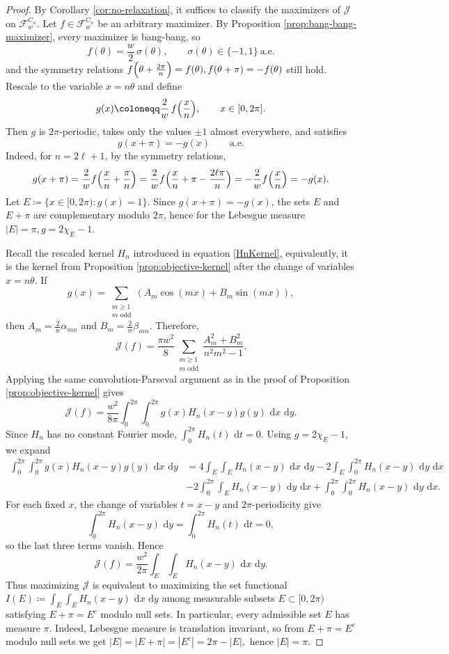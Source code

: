 \documentclass[11pt,letterpaper,reqno]{amsart}
\newcommand{\dd}{\,\mathrm{d}}
\begin{document}
\begin{proof}
By Corollary \ref{cor:no-relaxation}, it suffices to classify the maximizers of $\mathcal J$ on $\mathcal F_w^{C_n}$. Let $f\in\mathcal F_w^{C_n}$ be an arbitrary maximizer. By Proposition \ref{prop:bang-bang-maximizer}, every maximizer is bang-bang, so
\[
f(\theta)=\frac w2\,\sigma(\theta),\qquad \sigma(\theta)\in\{-1,1\}\ \text{a.e.}
\]
and the symmetry relations
\(
f\Bigl(\theta+\frac{2\pi}{n}\Bigr)=f(\theta),
f(\theta+\pi)=-f(\theta)
\)
still hold.
Rescale to the variable $x=n\theta$ and define
\[
g(x)\coloneqq \frac{2}{w}\,f\Bigl(\frac{x}{n}\Bigr),\qquad x\in[0,2\pi].
\]
Then $g$ is $2\pi$-periodic, takes only the values $\pm1$ almost everywhere, and satisfies
\[
g(x+\pi)=-g(x)\qquad\text{a.e.}
\]
Indeed, for $n=2\ell+1$, by the symmetry relations,
\[
g(x+\pi)=\frac{2}{w}f\Bigl(\frac{x}{n}+\frac{\pi}{n}\Bigr)=\frac{2}{w}f\Bigl(\frac{x}{n}+\pi-\frac{2\ell\pi}{n}\Bigr)=-\frac{2}{w}f\Bigl(\frac{x}{n}\Bigr)=-g(x).
\]
Let
\(
E\coloneqq\{x\in[0,2\pi):g(x)=1\}.
\)
Since $g(x+\pi)=-g(x)$, the sets $E$ and $E+\pi$ are complementary modulo $2\pi$, hence for the Lebesgue measure
\(
|E|=\pi,
g=2\chi_E-1.
\)

Recall the rescaled kernel $H_n$ introduced in equation \eqref{HnKernel}, equivalently, it is the kernel from Proposition \ref{prop:objective-kernel} after the change of variables $x=n\theta$.
If
\[
g(x)=\sum_{\substack{m\ge1\\m\text{ odd}}}(A_m\cos(mx)+B_m\sin(mx)),
\]
then $A_m=\frac{2}{w}\alpha_{mn}$ and $B_m=\frac{2}{w}\beta_{mn}$. Therefore,
\[
\mathcal J(f)=\frac{\pi w^2}{8}\sum_{\substack{m\ge1\\m\text{ odd}}}\frac{A_m^2+B_m^2}{n^2m^2-1}.
\]
Applying the same convolution-Parseval argument as in the proof of Proposition \ref{prop:objective-kernel} gives
\[
\mathcal J(f)=\frac{w^2}{8\pi}\int_0^{2\pi}\int_0^{2\pi} g(x)H_n(x-y)g(y)\,\dd x\,\dd y.
\]
Since $H_n$ has no constant Fourier mode,
\(
\int_0^{2\pi}H_n(t)\,\dd t=0.
\)
Using $g=2\chi_E-1$, we expand
\begin{align*}
\int_0^{2\pi}\!\int_0^{2\pi} g(x)H_n(x-y)g(y)\,\dd x\,\dd y&=
4\int_E\!\int_E H_n(x-y)\,\dd x\,\dd y -2\int_E\!\int_0^{2\pi} H_n(x-y)\,\dd y\,\dd x\\
&-2\int_0^{2\pi}\!\int_E H_n(x-y)\,\dd y\,\dd x  +\int_0^{2\pi}\!\int_0^{2\pi} H_n(x-y)\,\dd y\,\dd x.
\end{align*}
For each fixed $x$, the change of variables $t=x-y$ and $2\pi$-periodicity give
\[
\int_0^{2\pi} H_n(x-y)\,\dd y=\int_0^{2\pi}H_n(t)\,\dd t=0,
\]
so the last three terms vanish. Hence
\[
\mathcal J(f)=\frac{w^2}{2\pi}\int_E\int_E H_n(x-y)\,\dd x\,\dd y.
\]
Thus maximizing $\mathcal J$ is equivalent to maximizing the set functional
\(
I(E)\coloneqq \int_E\int_E H_n(x-y)\,\dd x\,\dd y
\)
among measurable subsets $E\subset[0,2\pi)$ satisfying $E+\pi=E^c$ modulo null sets. In particular, every admissible set $E$ has measure $\pi$.
Indeed, Lebesgue measure is translation invariant, so from $E+\pi=E^c$ modulo null sets we get
\(
|E|=|E+\pi|=|E^c|=2\pi-|E|,
\)
hence $|E|=\pi$.


\end{proof}
\end{document}
